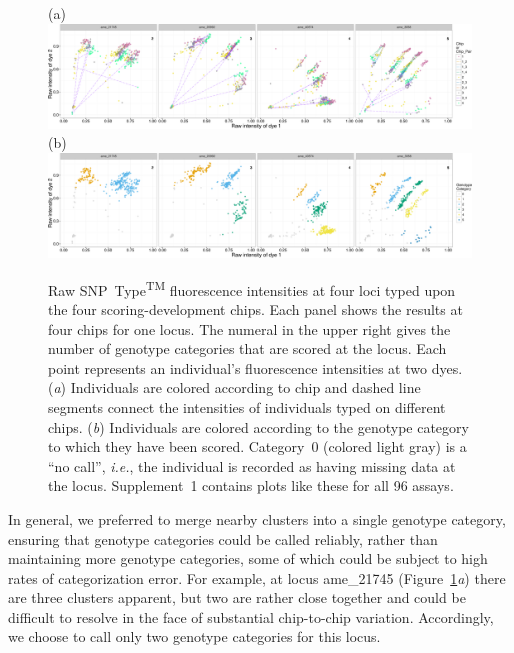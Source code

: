 \documentclass[twocolumn,natbib]{svjour3}       %
\newcommand{\ie}{{\em i.e.},\xspace }
\newcommand{\snptype}{SNP~Type\textsuperscript{{\tiny TM}}}
\begin{document}
\begin{figure}
(a)\\
\includegraphics[width = \textwidth]{four_loci_by_plate-crop.pdf} \\
(b)\\
\includegraphics[width = \textwidth]{four_loci_by_geno-crop.pdf}
\caption{ Raw \snptype{} fluorescence intensities at four loci typed upon the four
scoring-development chips. Each panel
shows the results at four chips for one locus.  The numeral in the upper right gives the number
of genotype categories that are scored at the locus.  Each point represents an individual's fluorescence
intensities at two dyes. ({\em a}) Individuals are colored according to chip and dashed line
segments connect the intensities of individuals typed on different chips. ({\em b}) Individuals are colored
according to the genotype category to which they have been scored.  Category~0 (colored light gray) is a ``no call'', \ie the individual
is recorded as having missing data at the locus. Supplement~1 contains plots 
like these for all 96 assays.}
\label{fig:plate_xy}
\end{figure}
In general, we preferred to merge
nearby clusters into a single genotype category, ensuring that genotype
categories could be called reliably, rather than maintaining 
more genotype
categories, some of which could be subject to high rates of
categorization error. For example, at 
locus ame\_21745 (Figure~\ref{fig:plate_xy}{\em a})    
there are three clusters apparent, but two  
are rather close together and could be difficult to resolve in the face of
substantial chip-to-chip variation.   Accordingly,
we choose to call only two genotype categories for this locus.
\end{document}
